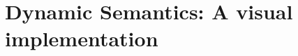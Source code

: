\newpage
\visHeader

\section{Dynamic Semantics: A visual implementation}
\hypertarget{visSDM start}{}

















